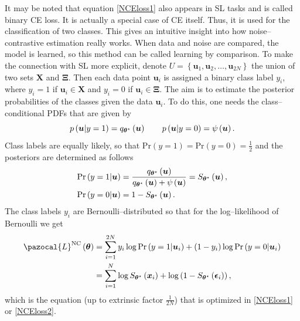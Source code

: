 It may be noted that equation \eqref{NCEloss1} also appears in SL tasks and is called binary
CE loss. It is actually a special case of CE itself. Thus, it is used for the classification of two classes. This gives an intuitive insight into how noise--contrastive estimation
really works. When data and noise are compared, the model is learned, so this method can be called
learning by comparison. To make the connection with SL more explicit, denote $U = \left\lbrace\boldsymbol{u}_1, \boldsymbol{u}_2,\dots,\boldsymbol{u}_{2N} \right\rbrace$ the union of two sets $\boldsymbol{X}$ and $\boldsymbol{\Xi}$. Then each data point $\boldsymbol{u}_i$ is assigned a binary class label $y_i$, where $y_i = 1$ if $\boldsymbol{u}_i \in \boldsymbol{X}$ and $y_i = 0$ if $\boldsymbol{u}_i \in \boldsymbol{\Xi}$. The aim is to estimate the posterior probabilities of the classes given the data $\boldsymbol{u}_i$. To do this, one needs the class--conditional PDFs that are given by
\begin{equation}
    p\left(\boldsymbol{u}\vert y =1 \right) =  q_{\boldsymbol{\theta}^\star}\left(\boldsymbol{u} \right) \qquad p\left(\boldsymbol{u}\vert y =0 \right) =  \psi\left(\boldsymbol{u} \right).
\end{equation}
Class labels are equally likely, so that $\mathrm{Pr}\left(y = 1\right) =\mathrm{Pr}\left(y = 0\right)=\frac{1}{2}$ and the posteriors are determined as follows
\begin{align}
    \mathrm{Pr}\left( y=1 \vert\boldsymbol{u} \right) &= \frac{q_{\boldsymbol{\theta}^\star}\left(\boldsymbol{u} \right)}{q_{\boldsymbol{\theta}^\star}\left(\boldsymbol{u} \right) + \psi\left(\boldsymbol{u} \right)} = S_{\boldsymbol{\theta}^\star}\left(\boldsymbol{u}\right),\\
    \mathrm{Pr}\left( y=0\vert \boldsymbol{u} \right) &= 1 - S_{\boldsymbol{\theta}^\star}\left(\boldsymbol{u}\right).
\end{align}
The class labels $y_i$ are Bernoulli--distributed so that
for the log--likelihood of Bernoulli we get
\begin{align}
    \pazocal{L}^{\mathrm{NC}}\left(\bt\right) &= \sum_{i=1}^{2N} y_i\log \mathrm{Pr}\left( y=1 \vert\boldsymbol{u}_i \right) + \left(1-y_i\right)\log \mathrm{Pr}\left( y=0 \vert\boldsymbol{u}_i \right) \\
    &= \sum_{i=1}^{N}\log S_{\bt^\star}\left(\boldsymbol{x}_i\right) +\log \left(1 - S_{\bt^\star}\left(\boldsymbol{\epsilon}_i\right)\right),
\end{align}
which is the equation (up to extrinsic factor $\frac{1}{2N}$) that is optimized in \eqref{NCEloss1} or \eqref{NCEloss2}.
